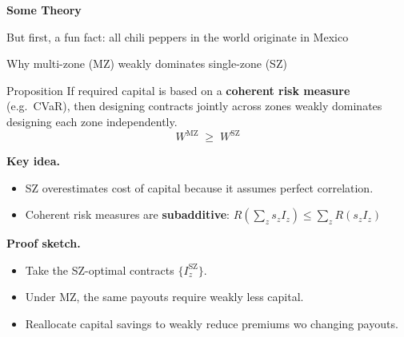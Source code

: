 \documentclass{beamer}
\begin{document}
    \begin{frame}[plain]
      \centering
      \vspace{2cm}
      
      {\Large \textbf{Some Theory}}
      
      \vspace{0.6cm}
      {\large But first, a fun fact: all chili peppers in the world originate in Mexico}
      
      \end{frame}

    \begin{frame}{Why multi-zone (MZ) weakly dominates single-zone (SZ)}
      \small
      
      \begin{block}{Proposition}
      If required capital is based on a \textbf{coherent risk measure} (e.g.\ CVaR),
      then designing contracts jointly across zones weakly dominates designing each zone independently.
      \[
      \boxed{\; W^{\text{MZ}} \;\ge\; W^{\text{SZ}} \;}
      \]
      \end{block}
      
      \medskip
      
      \textbf{Key idea.}
      \begin{itemize}\itemsep1.5pt
          \item SZ overestimates cost of capital because it assumes perfect correlation.
          \item Coherent risk measures are \textbf{subadditive}: $R \left ( \sum_z s_z I_z \right ) \leq \sum_z R\left ( s_z I_z \right )$
      \end{itemize}
      
      \medskip
      
      \textbf{Proof sketch.}
      \begin{itemize}\itemsep1.5pt
          \item Take the SZ-optimal contracts $\{I_z^{\text{SZ}}\}$.
          \item Under MZ, the same payouts require weakly less capital.
          \item Reallocate capital savings to weakly reduce premiums wo changing payouts.
      \end{itemize}

      
      \end{frame}
\end{document}
